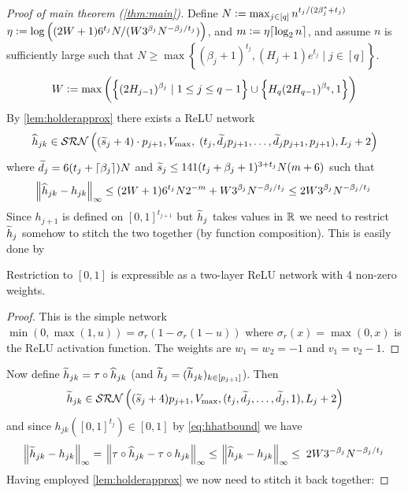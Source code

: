 \begin{proof}[Proof of main theorem (\ref{thm:main})]
  Define 
  $N \vcentcolon= \max_{j \in [q]} n^{t_j/(2 \beta^*_j + t_j)}$
  $\eta \vcentcolon= \log \left((2W + 1) 6^{t_j} N
  / (W 3^{\beta_j} N^{-\beta_j/t_j}) \right)$,
  and $m \vcentcolon= \eta \lceil\log_2 n\rceil$,
  and assume $n$ is sufficiently large such that
  $N \geq \max \left\{ (\beta_j + 1)^{t_j},
  (H_j+1)e^{t_j} \mid j \in [q] \right\}$.
  \begin{equation}
    W \vcentcolon= \max \left( \left\{ (2 H_{j-1})^{\beta_j}
      \mid 1\leq j\leq q-1 \right\}
    \cup \left\{ H_q(2H_{q-1})^{\beta_q}, 1\right\} \right)
  \end{equation}
  By \cref{lem:holderapprox} there exists a ReLU network
  \begin{equation}
    \widehat{h}_{jk} \in \mathcal{SRN} \left( (\widetilde{s}_j + 4) \cdot p_{j+1}, V_{\max}, \;
    ( t_j, \widetilde{d}_j p_{j+1}, \dots,
  \widetilde{d}_j p_{j+1}, p_{j+1}), L_j + 2 \right)
  \end{equation}
  where $\widetilde{d}_j = 6(t_j + \lceil\beta_j\rceil)N$ and
  $\widetilde{s}_j \leq 141 (t_j + \beta_j + 1)^{3 + t_j} N (m + 6)$
  such that
  \begin{equation}
    \norm{\widehat{h}_{jk} - h_{jk}}_\infty \leq (2 W + 1) 6^{t_j} N 2^{-m}
    + W 3^{\beta_j} N^{-\beta_j/t_j} \leq 2 W 3^{\beta_j} N^{-\beta_j/t_j}
    \label{eq:hhatbound}
  \end{equation} 
  Since $h_{j+1}$ is defined on $[0, 1]^{t_{j+1}}$ but $\widetilde{h}_j$ takes values
  in $\mathbb{R}$ we need to restrict $\widetilde{h}_j$ somehow to stitch
  the two together (by function composition). This is easily done by
  \begin{lem}
    Restriction to $[0, 1]$ is expressible as a two-layer ReLU network
    with 4 non-zero weights.
  \end{lem}
  \begin{proof}
    This is the simple network
    $\min(0,\max(1, u)) = \sigma_r(1 - \sigma_r(1 - u))$
    where $\sigma_r(x) = \max(0,x)$ is the ReLU activation function.
    The weights are $w_1 = w_2 = -1$ and $v_1 = v_2 - 1$.
  \end{proof}
  Now define
  $\widetilde{h}_{jk} = \tau \circ \widehat{h}_{jk}$
  (and $\widetilde{h}_{j} = (\widetilde{h}_{jk})_{k \in [p_{j + 1}]}$).
  Then
  \begin{equation}
    \widetilde{h}_{jk} \in \mathcal{SRN}\left( (\widetilde{s}_j + 4) p_{j+1},
    V_{\max}, (t_j, \widetilde{d}_j, \dots, \widetilde{d}_j, 1), L_j + 2 \right)
  \end{equation}
  and since $h_{jk}([0, 1]^{t_j}) \in [0, 1]$ by \cref{eq:hhatbound} we have
  \begin{align}
    \norm{\widetilde{h}_{jk} - h_{jk}}_\infty
    = \; \norm{\tau \circ \widehat{h}_{jk} - \tau \circ h_{jk}}_\infty
     \leq \; \norm{\widehat{h}_{jk} - h_{jk}}_\infty
     \leq \; 2 W 3^{-\beta_j} N^{-\beta_j/t_j}
  \end{align}
  Having employed \cref{lem:holderapprox}
  we now need to stitch it
  back together:


\end{proof}
